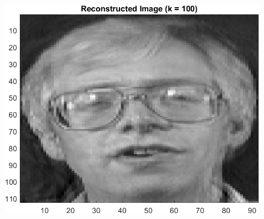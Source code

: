 \documentclass{article}
\begin{document}
\begin{figure}[!htb]
    \begin{minipage}[b]{0.3\textwidth}
        \includegraphics[width=\textwidth]{orl_recon_100.png}
    \end{minipage}
\end{figure}
\end{document}
